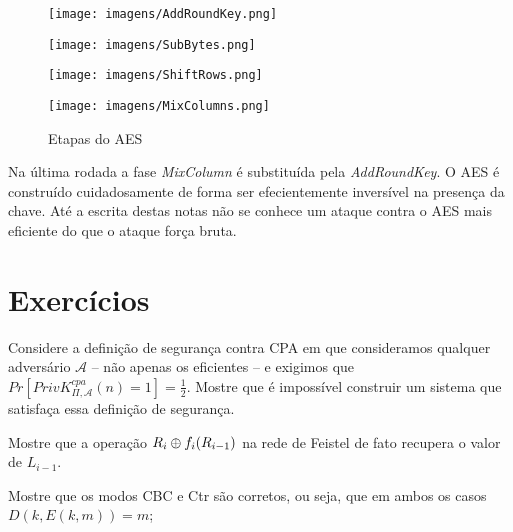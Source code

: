 \begin{figure}[!htp]
  \centering
  \begin{minipage}{.45\textwidth}
    \centering
    \texttt{[image: imagens/AddRoundKey.png]}  
  \end{minipage}
 \begin{minipage}{.45\textwidth}
    \centering
    \texttt{[image: imagens/SubBytes.png]}
  \end{minipage}
  \begin{minipage}{.45\textwidth}
    \centering
    \texttt{[image: imagens/ShiftRows.png]}  
  \end{minipage}
 \begin{minipage}{.45\textwidth}
    \centering
    \texttt{[image: imagens/MixColumns.png]}
  \end{minipage}
  \caption{Etapas do AES}
  \label{fig:aes}
\end{figure}

Na última rodada a fase {\em MixColumn} é substituída pela {\em AddRoundKey}.
O AES é construído cuidadosamente de forma ser efecientemente inversível na presença da chave.
Até a escrita destas notas não se conhece um ataque contra o AES mais eficiente do que o ataque força bruta.




\section{Exercícios}
\label{sec:exercicios}

\begin{exercicio}
  Considere a definição de segurança contra CPA em que consideramos qualquer adversário $\mathcal{A}$ -- não apenas os eficientes -- e exigimos que $Pr[PrivK^{cpa}_{\Pi,\mathcal{A}}(n) = 1] = \frac{1}{2}$.
  Mostre que é impossível construir um sistema que satisfaça essa definição de segurança.
\end{exercicio}

\begin{exercicio}
Mostre que a operação $R_i \oplus f_i(R_{i-1})$ na rede de Feistel de fato recupera o valor de $L_{i-1}$.
\end{exercicio}

\begin{exercicio}
  Mostre que os modos CBC e Ctr são corretos, ou seja, que em ambos os casos $D(k, E(k,m)) = m$;
\end{exercicio}

